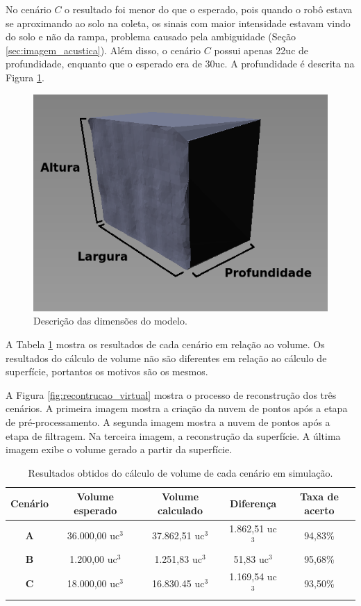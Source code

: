 No cenário $C$ o resultado foi menor do que o esperado, pois quando o robô estava se aproximando ao solo na coleta, os sinais com maior intensidade estavam vindo do solo e não da rampa, problema causado pela ambiguidade (Seção \ref{sec:imagem_acustica}).
Além disso, o cenário $C$ possui apenas 22uc de profundidade, enquanto que o esperado era de 30uc.
A profundidade é descrita na Figura \ref{fig:dimensoes_modelo}.

\begin{figure}[H]
    \centering
    \includegraphics[scale=0.6]{dados/figuras/dimensoes_modelo.png}
    \caption{Descrição das dimensões do modelo.}
    \label{fig:dimensoes_modelo}
\end{figure}


A Tabela \ref{tab:tabela_result_cenarios_vol} mostra os resultados de cada cenário em relação ao volume.
Os resultados do cálculo de volume não são diferentes em relação ao cálculo de superfície, portantos os motivos são os mesmos.

A Figura \ref{fig:recontrucao_virtual} mostra o processo de reconstrução dos três cenários. 
A primeira imagem mostra a criação da nuvem de pontos após a etapa de pré-processamento.
A segunda imagem mostra a nuvem de pontos após a etapa de filtragem.
Na terceira imagem, a reconstrução da superfície.
A última imagem exibe o volume gerado a partir da superfície.

\begin{table}[H]
    \centering
    \caption{Resultados obtidos do cálculo de volume de cada cenário em simulação.}
    \begin{tabular}{@{}ccccc@{}}
        \toprule
        \textbf{Cenário} & \textbf{Volume esperado} & \textbf{Volume calculado} & \textbf{Diferença} & \textbf{Taxa de acerto} \\ \midrule
        \textbf{A} & 36.000,00 uc$^3$ & 37.862,51 uc$^3$ & 1.862,51 uc$^3$ & 94,83\% \\
        \textbf{B} & 1.200,00 uc$^3$ & 1.251,83 uc$^3$ & 51,83 uc$^3$ & 95,68\% \\
        \textbf{C} & 18.000,00 uc$^3$ & 16.830.45 uc$^3$ & 1.169,54 uc$^3$ & 93,50\% \\ \bottomrule
    \end{tabular}
    \label{tab:tabela_result_cenarios_vol}
\end{table}

